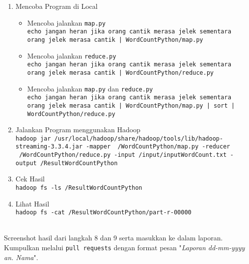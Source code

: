 \documentclass[a4paper]{tufte-handout}
\begin{document}
\begin{enumerate}
\item Mencoba Program di Local
\begin{itemize}
\item Mencoba jalankan {\tt map.py} \\
{\tt echo jangan heran jika orang cantik merasa jelek sementara orang jelek merasa cantik | WordCountPython/map.py}
\item Mencoba jalankan {\tt reduce.py} \\
{\tt echo jangan heran jika orang cantik merasa jelek sementara orang jelek merasa cantik | WordCountPython/reduce.py}
\item Mencoba jalankan {\tt map.py} dan {\tt reduce.py} \\
{\tt echo jangan heran jika orang cantik merasa jelek sementara orang jelek merasa cantik | WordCountPython/map.py | sort | WordCountPython/reduce.py}
\end{itemize}

\item Jalankan Program menggunakan Hadoop \\
{\tt hadoop jar /usr/local/hadoop/share/hadoop/tools/lib/hadoop-streaming-3.3.4.jar -mapper ~/WordCountPython/map.py -reducer ~/WordCountPython/reduce.py -input /input/inputWordCount.txt -output /ResultWordCountPython}

\item Cek Hasil \\
{\tt hadoop fs -ls /ResultWordCountPython}

\item Lihat Hasil \\
{\tt hadoop fs -cat /ResultWordCountPython/part-r-00000}
\end{enumerate}

\vspace*{-.5cm}
 \\
Screenshot hasil dari langkah 8 dan 9 serta masukkan ke dalam laporan. Kumpulkan melalui {\tt pull requests} dengan format pesan "\textit{Laporan dd-mm-yyyy an. Nama}".

\hrulefill

\clearpage
{}

\end{document}
